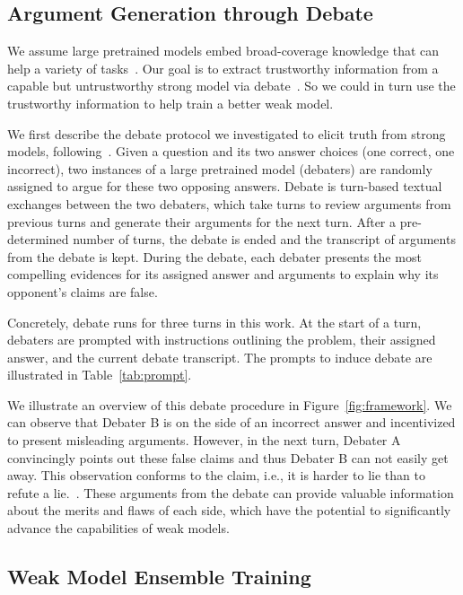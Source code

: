 \documentclass[letterpaper]{article} %
\begin{document}
\subsection{Argument Generation through Debate}

We assume large pretrained models embed broad-coverage knowledge that can help a variety of tasks~\cite{brown2020language}.
Our goal is to extract trustworthy information from a capable but untrustworthy strong model via debate~\cite{bowman2022measuring}.
So we could in turn use the trustworthy information to help train a better weak model.

We first describe the debate protocol we investigated to elicit truth from strong models, following~\cite{michael2023debate,khan2024debating,kenton2024scalable}.
Given a question and its two answer choices (one correct, one incorrect), two instances of a large pretrained model (debaters) are randomly assigned to argue for these two opposing answers.
Debate is turn-based textual exchanges between the two debaters, which take turns to review arguments from previous turns and generate their arguments for the next turn.
After a pre-determined number of turns, the debate is ended and the transcript of arguments from the debate is kept.
During the debate, each debater presents the most compelling evidences for its assigned answer and arguments to explain why its opponent’s claims are false.

Concretely, debate runs for three turns in this work.
At the start of a turn, debaters are prompted with instructions outlining the problem, their assigned answer, and the current debate transcript.
The prompts to induce debate are illustrated in Table~\ref{tab:prompt}.

We illustrate an overview of this debate procedure in Figure~\ref{fig:framework}.
We can observe that Debater B is on the side of an incorrect answer and incentivized to present misleading arguments.
However, in the next turn, Debater A convincingly points out these false claims and thus Debater B can not easily get away.
This observation conforms to the claim, i.e., it is harder to lie than to refute a lie.~\cite{irving2018ai}.
These arguments from the debate can provide valuable information about the merits and flaws of each side, which have the potential to significantly advance the capabilities of weak models.

\subsection{Weak Model Ensemble Training}
\end{document}
